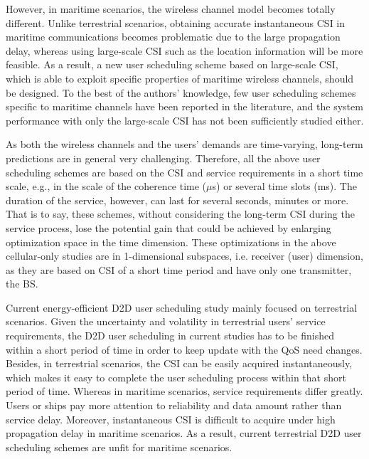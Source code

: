 \documentclass{ieeeaccess}
\begin{document}

However, in maritime scenarios, the wireless channel model becomes totally different. Unlike terrestrial scenarios, obtaining accurate instantaneous CSI in maritime communications becomes problematic due to the large propagation delay, whereas using large-scale CSI such as the location information will be more feasible. As a result, a new user scheduling scheme based on large-scale CSI, which is able to exploit specific properties of maritime wireless channels, should be designed. To the best of the authors' knowledge, few user scheduling schemes specific to maritime channels have been reported in the literature, and the system performance with only the large-scale CSI has not been sufficiently studied either. 

As both the wireless channels and the users' demands are time-varying, long-term predictions are in general very challenging. Therefore, all the above user scheduling schemes are based on the CSI and service requirements in a short time scale, e.g., in the scale of the coherence time ($\mu$s) or several time slots (ms). The duration of the service, however, can last for several seconds, minutes or more. That is to say, these schemes, without considering the long-term CSI during the service process, lose the potential gain that could be achieved by enlarging optimization space in the time dimension. These optimizations in the above cellular-only studies are in 1-dimensional subspaces, i.e. receiver (user) dimension, as they are based on CSI of a short time period and have only one transmitter, the BS. 

Current energy-efficient D2D user scheduling study mainly focused on terrestrial scenarios. Given the uncertainty and volatility in terrestrial users' service requirements, the D2D user scheduling in current studies has to be finished within a short period of time in order to keep update with the QoS need changes. Besides, in terrestrial scenarios, the CSI can be easily acquired instantaneously, which makes it easy to complete the user scheduling process within that short period of time. 
Whereas in maritime scenarios, service requirements differ greatly. Users or ships pay more attention to reliability and data amount rather than service delay. Moreover, instantaneous CSI is difficult to acquire under high propagation delay in maritime scenarios. As a result, current terrestrial D2D user scheduling schemes are unfit for maritime scenarios. 
\end{document}
